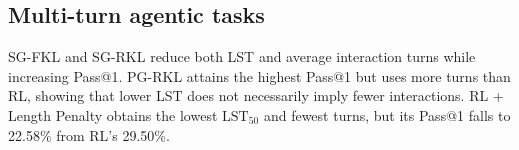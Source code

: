 \subsection{Multi-turn agentic tasks}
\begin{table}[htbp]
  \centering
  \caption{\textbf{Evaluation results on multi-turn agentic tasks.}
  Values correspond to Figure~\ref{fig:agent-main}.
  Pass@1 and LST are in percent; lengths are in tokens.}
  \label{tab:agent-main-results}
  \small
  \setlength{\tabcolsep}{5pt}
\end{table}

SG-FKL and SG-RKL reduce both LST and average interaction turns while increasing
Pass@1. PG-RKL attains the highest Pass@1 but uses more turns than RL,
showing that lower LST does not necessarily imply fewer interactions.
RL + Length Penalty obtains the lowest $\mathrm{LST}_{50}$ and fewest turns, but its
Pass@1 falls to 22.58\% from RL's 29.50\%.

